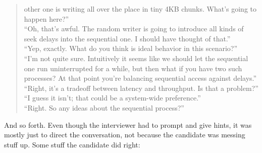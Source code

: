 \documentclass{article}
\begin{document}
\begin{quote}
  other one is writing all over the place in tiny 4KB chunks. What's
  going to happen here?'' \\
``Oh, that's awful. The random writer is going to introduce all kinds
  of seek delays into the sequential one. I should have thought of
  that.'' \\
``Yep, exactly. What do you think is ideal behavior in this scenario?''
\\
``I'm not quite sure. Intuitively it seems like we should let the
  sequential one run uninterrupted for a while, but then what if you
  have two such processes? At that point you're balancing sequential
  access against delays.'' \\
``Right, it's a tradeoff between latency and throughput. Is that a
  problem?'' \\
``I guess it isn't; that could be a system-wide preference.'' \\
``Right. So any ideas about the sequential process?''
\end{quote}

      And so forth. Even though the interviewer had to prompt and give hints,
      it was mostly just to direct the conversation, not because the candidate
      was messing stuff up. Some stuff the candidate did right:
\end{document}
